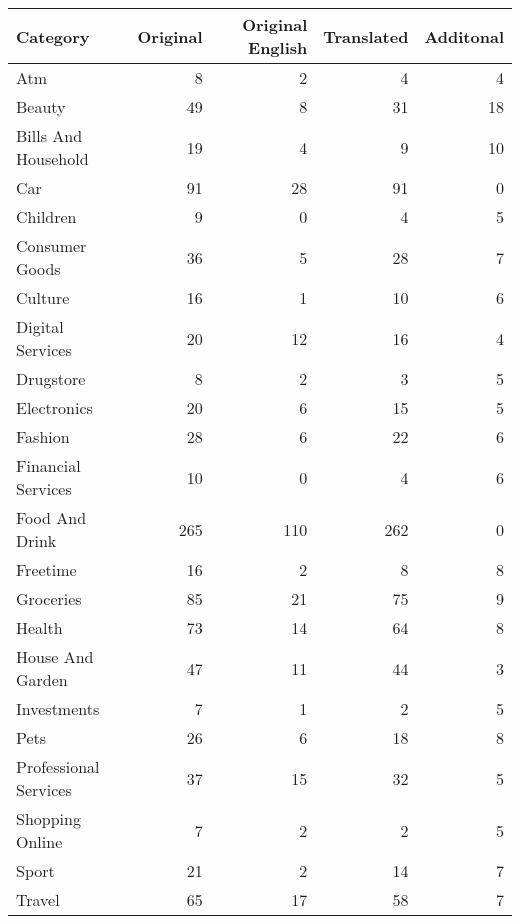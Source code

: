 \begin{tabular}{lrrrr}
\toprule
             Category &  Original &  Original English &  Translated &  Additonal \\
\midrule
                  Atm &         8 &                 2 &           4 &          4 \\
               Beauty &        49 &                 8 &          31 &         18 \\
  Bills And Household &        19 &                 4 &           9 &         10 \\
                  Car &        91 &                28 &          91 &          0 \\
             Children &         9 &                 0 &           4 &          5 \\
       Consumer Goods &        36 &                 5 &          28 &          7 \\
              Culture &        16 &                 1 &          10 &          6 \\
     Digital Services &        20 &                12 &          16 &          4 \\
            Drugstore &         8 &                 2 &           3 &          5 \\
          Electronics &        20 &                 6 &          15 &          5 \\
              Fashion &        28 &                 6 &          22 &          6 \\
   Financial Services &        10 &                 0 &           4 &          6 \\
       Food And Drink &       265 &               110 &         262 &          0 \\
             Freetime &        16 &                 2 &           8 &          8 \\
            Groceries &        85 &                21 &          75 &          9 \\
               Health &        73 &                14 &          64 &          8 \\
     House And Garden &        47 &                11 &          44 &          3 \\
          Investments &         7 &                 1 &           2 &          5 \\
                 Pets &        26 &                 6 &          18 &          8 \\
Professional Services &        37 &                15 &          32 &          5 \\
      Shopping Online &         7 &                 2 &           2 &          5 \\
                Sport &        21 &                 2 &          14 &          7 \\
               Travel &        65 &                17 &          58 &          7 \\
\bottomrule
\end{tabular}
